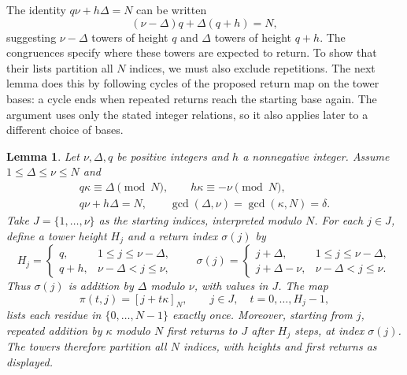 \documentclass[11pt,a4paper]{article}
\newtheorem{lemma}[theorem]{Lemma}
\theoremstyle{definition}
\theoremstyle{remark}
\numberwithin{equation}{section}
\begin{document}
The identity $q\nu+h\Delta=N$ can be written
\[
 (\nu-\Delta)q+\Delta(q+h)=N,
\]
suggesting $\nu-\Delta$ towers of height $q$ and $\Delta$ towers of height $q+h$. The congruences specify where these towers are expected to return. To show that their lists partition all $N$ indices, we must also exclude repetitions. The next lemma does this by following cycles of the proposed return map on the tower bases: a cycle ends when repeated returns reach the starting base again. The argument uses only the stated integer relations, so it also applies later to a different choice of bases.

\begin{lemma}\label{lem:suspension}
Let $\nu,\Delta,q$ be positive integers and $h$ a nonnegative integer. Assume $1\le\Delta\le\nu\le N$ and
\[
 \begin{gathered}
 q\kappa\equiv\Delta\pmod N,\qquad h\kappa\equiv-\nu\pmod N,\\
 q\nu+h\Delta=N,\qquad \gcd(\Delta,\nu)=\gcd(\kappa,N)=\delta.
 \end{gathered}
\]
Take $J=\{1,\ldots,\nu\}$ as the starting indices, interpreted modulo $N$. For each $j\in J$, define a tower height $H_j$ and a return index $\sigma(j)$ by
\[
 H_j=\begin{cases}
 q,&1\le j\le\nu-\Delta,\\
 q+h,&\nu-\Delta<j\le\nu,
 \end{cases}
 \qquad
 \sigma(j)=\begin{cases}
 j+\Delta,&1\le j\le\nu-\Delta,\\
 j+\Delta-\nu,&\nu-\Delta<j\le\nu.
 \end{cases}
\]
Thus $\sigma(j)$ is addition by $\Delta$ modulo $\nu$, with values in $J$. The map
\[
 \pi(t,j)=[j+t\kappa]_N,\qquad j\in J,\quad t=0,\ldots,H_j-1,
\]
lists each residue in $\{0,\ldots,N-1\}$ exactly once. Moreover, starting from $j$, repeated addition by $\kappa$ modulo $N$ first returns to $J$ after $H_j$ steps, at index $\sigma(j)$. The towers therefore partition all $N$ indices, with heights and first returns as displayed.
\end{lemma}
\end{document}
